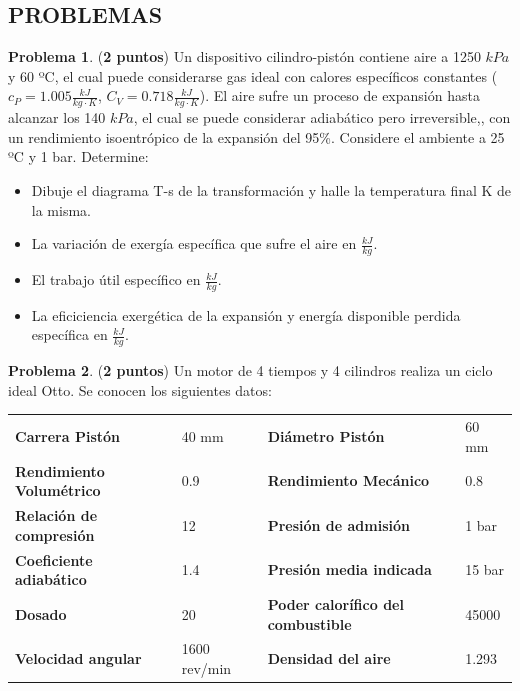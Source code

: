 \documentclass[12pt]{article}
\begin{document}
\subsection{PROBLEMAS}
\textbf{Problema 1}. (\textbf{2 puntos}) Un dispositivo cilindro-pistón contiene aire a 1250 $kPa$ y 60 ºC, el cual puede considerarse gas ideal con calores específicos constantes ($c _{P} = 1.005 \frac{kJ}{kg \cdot K}$, $C _{V} = 0.718 \frac{kJ}{kg \cdot K}$). El aire sufre un proceso de expansión hasta alcanzar los 140 $kPa$, el cual se puede considerar adiabático pero irreversible,, con un rendimiento isoentrópico de la expansión del 95\%. Considere el ambiente a 25 ºC y 1 bar. Determine:
\begin{itemize}
    \item Dibuje el diagrama T-s de la transformación y halle la temperatura final K de la misma.
    \item La variación de exergía específica que sufre el aire en $\frac{kJ}{kg}$.
    \item El trabajo útil específico en $\frac{kJ}{kg}$.
    \item La eficiciencia exergética de la expansión y energía disponible perdida específica en $\frac{kJ}{kg}$.
\end{itemize}

\textbf{Problema 2}. (\textbf{2 puntos}) Un motor de 4 tiempos y 4 cilindros realiza un ciclo ideal Otto. Se conocen los siguientes datos:
\begin{table}[h]
    \begin{tabular}{ll|ll}
    \hline
    \textbf{Carrera Pistón}          & 40 mm        & \textbf{Diámetro Pistón}                  & 60 mm  \\
    \textbf{Rendimiento Volumétrico} & 0.9          & \textbf{Rendimiento Mecánico}             & 0.8    \\
    \textbf{Relación de compresión}  & 12           & \textbf{Presión de admisión}              & 1 bar  \\
    \textbf{Coeficiente adiabático}  & 1.4          & \textbf{Presión media indicada}           & 15 bar \\
    \textbf{Dosado}                  & 20           & \textbf{Poder calorífico del combustible} & 45000  \\
    \textbf{Velocidad angular}       & 1600 rev/min & \textbf{Densidad del aire}                & 1.293  \\ \hline
    \end{tabular}
\end{table}
\end{document}
